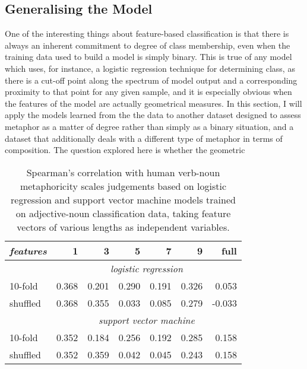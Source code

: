 \subsection{Generalising the Model} \label{sec:genaphor}
One of the interesting things about feature-based classification is that there is always an inherent commitment to degree of class membership, even when the training data used to build a model is simply binary.  This is true of any model which uses, for instance, a logistic regression technique for determining class, as there is a cut-off point along the spectrum of model output and a corresponding proximity to that point for any given sample, and it is especially obvious when the features of the model are actually geometrical measures.  In this section, I will apply the models learned from the the \cite{GutierrezEA2016} data to another dataset designed to assess metaphor as a matter of degree rather than simply as a binary situation, and a dataset that additionally deals with a different type of metaphor in terms of composition.  The question explored here is whether the geometric 

\begin{table}
\centering
\begin{tabular}{lrrrrrr}
\hline
\emph{features} & 1 & 3 & 5 & 7 & 9 & full \\
\hline
& \multicolumn{6}{c}{\emph{logistic regression}} \\
10-fold & 0.368 & 0.201 & 0.290 & 0.191 & 0.326 & 0.053 \\
shuffled & 0.368 & 0.355 & 0.033 & 0.085 & 0.279 & -0.033 \\
\hline
& \multicolumn{6}{c}{\emph{support vector machine}} \\
10-fold & 0.352 & 0.184 & 0.256 & 0.192 & 0.285 & 0.158 \\
shuffled & 0.352 & 0.359 & 0.042 & 0.045 & 0.243 & 0.158 \\
\hline
\end{tabular}
\caption[Scoring Metaphoricity Based On Classification Data]{Spearman's correlation with human verb-noun metaphoricity scales judgements based on logistic regression and support vector machine models trained on adjective-noun classification data, taking feature vectors of various lengths as independent variables.}
\end{table}

